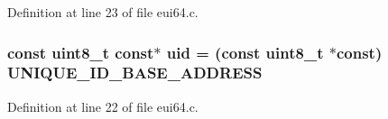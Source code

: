 Definition at line 23 of file eui64.\+c.

\subsubsection[{\texorpdfstring{uid}{uid}}]{\setlength{\rightskip}{0pt plus 5cm}const {\bf uint8\+\_\+t} const$\ast$ uid = (const {\bf uint8\+\_\+t} $\ast$const) {\bf U\+N\+I\+Q\+U\+E\+\_\+\+I\+D\+\_\+\+B\+A\+S\+E\+\_\+\+A\+D\+D\+R\+E\+SS}}\hypertarget{iot-lab___a8-_m3_2eui64_8c_a39099710e729efb534067f3d36d7f21f}{}\label{iot-lab___a8-_m3_2eui64_8c_a39099710e729efb534067f3d36d7f21f}


Definition at line 22 of file eui64.\+c.

